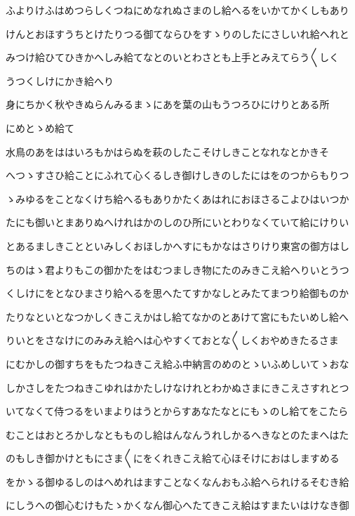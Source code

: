 \documentclass[a4paper,11pt,landscape]{ltjtarticle}
\begin{document}
\par\medskip
ふよりけふはめつらしくつねにめなれぬさまのし給へるをいかてかくしもあり
\par\medskip
けんとおほすうちとけたりつる御てならひをすゝりのしたにさしいれ給へれと
\par\medskip
みつけ給ひてひきかへしみ給てなとのいとわさとも上手とみえてらう〱しく
\par\medskip
うつくしけにかき給へり
\par\medskip
身にちかく秋やきぬらんみるまゝにあを葉の山もうつろひにけりとある所
\par\medskip
にめとゝめ給て
\par\medskip
水鳥のあをははいろもかはらぬを萩のしたこそけしきことなれなとかきそ
\par\medskip
へつゝすさひ給ことにふれて心くるしき御けしきのしたにはをのつからもりつ
\par\medskip
ゝみゆるをことなくけち給へるもありかたくあはれにおほさるこよひはいつか
\par\medskip
たにも御いとまありぬへけれはかのしのひ所にいとわりなくていて給にけりい
\par\medskip
とあるましきことといみしくおほしかへすにもかなはさりけり東宮の御方はし
\par\medskip
ちのはゝ君よりもこの御かたをはむつましき物にたのみきこえ給へりいとうつ
\par\medskip
くしけにをとなひまさり給へるを思へたてすかなしとみたてまつり給御ものか
\par\medskip
たりなといとなつかしくきこえかはし給てなかのとあけて宮にもたいめし給へ
\par\medskip
りいとをさなけにのみみえ給へは心やすくておとな〱しくおやめきたるさま
\par\medskip
にむかしの御すちをもたつねきこえ給ふ中納言のめのとゝいふめしいてゝおな
\par\medskip
しかさしをたつねきこゆれはかたしけなけれとわかぬさまにきこえさすれとつ
\par\medskip
いてなくて侍つるをいまよりはうとからすあなたなとにもゝのし給てをこたら
\par\medskip
むことはおとろかしなともものし給はんなんうれしかるへきなとのたまへはた
\par\medskip
のもしき御かけともにさま〱にをくれきこえ給て心ほそけにおはしますめる
\par\medskip
をかゝる御ゆるしのはへめれはますことなくなんおもふ給へられけるそむき給
\par\medskip
にしうへの御心むけもたゝかくなん御心へたてきこえ給はすまたいはけなき御
\end{document}
